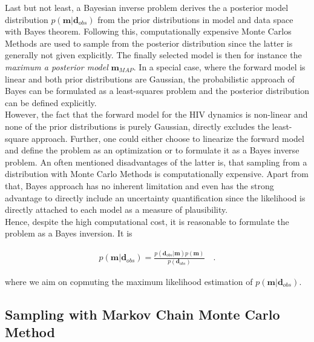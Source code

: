 Last but not least, a Bayesian inverse problem derives the a posterior model distribution $p(\mathbf{m}|\mathbf{d}_{obs})$ from the prior distributions in model and data space with Bayes theorem.
Following this, computationally expensive Monte Carlos Methods are used to sample from the posterior distribution since the latter is generally not given explicitly.
The finally selected model is then for instance the \textit{maximum a posterior model} $\mathbf{m}_{MAP}$.
In a special case, where the forward model is linear and both prior distributions are Gaussian, the probabilistic approach of Bayes can be formulated as a least-squares problem and the posterior distribution can be defined explicitly.\\
However, the fact that the forward model for the HIV dynamics is non-linear and none of the prior distributions is purely Gaussian, directly excludes the least-square approach.
Further, one could either choose to linearize the forward model and define the problem as an optimization or to formulate it as a Bayes inverse problem.
An often mentioned disadvantages of the latter is, that sampling from a distribution with Monte Carlo Methods is computationally expensive.
Apart from that, Bayes approach has no inherent limitation and even has the strong advantage to directly include an uncertainty quantification since the likelihood is directly attached to each model as a measure of plausibility.\\
Hence, despite the high computational cost, it is reasonable to formulate the problem as a Bayes inversion.
It is 

\begin{align}
    p(\mathbf{m}|\mathbf{d}_{obs}) = \frac{p(\mathbf{d}_{obs}|\mathbf{m})p(\mathbf{m})}{p(\mathbf{d}_{obs})} \quad .
\end{align}

where we aim on copmuting the maximum likelihood estimation of $p(\mathbf{m}|\mathbf{d}_{obs})$.

\subsection{Sampling with Markov Chain Monte Carlo Method}

